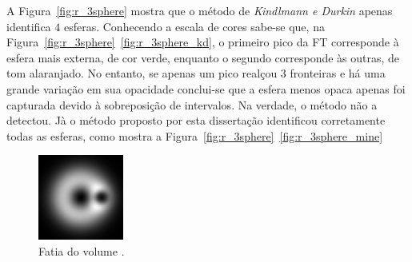 	A Figura~\ref{fig:r_3sphere} mostra que o método de \textit{Kindlmann e Durkin} apenas identifica $ 4 $ esferas. Conhecendo a escala de cores sabe-se que, na Figura~\ref{fig:r_3sphere}~\ref{fig:r_3sphere_kd}, o primeiro pico da FT corresponde à esfera mais externa, de cor verde, enquanto o segundo corresponde às outras, de tom alaranjado. No entanto, se apenas um pico realçou 3 fronteiras e há uma grande variação em sua opacidade conclui-se que a esfera menos opaca apenas foi capturada devido à sobreposição de intervalos. Na verdade, o método não a detectou. Jà o método proposto por esta dissertação identificou corretamente todas as esferas, como mostra a Figura~\ref{fig:r_3sphere}~\ref{fig:r_3sphere_mine}

\begin{figure}[h]
	\centering
	\includegraphics[width=0.25\textwidth]{images/g_nucleon_slice}
	\caption{Fatia do volume .}
	\label{fig:r_nucleon_slice}
\end{figure}

